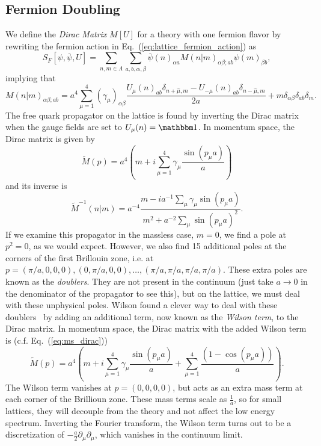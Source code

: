 \subsection{Fermion Doubling}
We define the \emph{Dirac Matrix} $M[U]$ for a theory with one fermion flavor by rewriting the fermion action in Eq.~(\ref{eq:lattice_fermion_action}) as
\begin{equation}
    S_F[\psi, \overline \psi, U] = \sum_{n,m\in \Lambda} \sum_{a,b,\alpha,\beta} \overline \psi(n)_{\alpha a} M(n|m)_{\alpha\beta;a b} \psi(m)_{\beta b},
\end{equation}
implying that
\begin{equation}
    M(n | m)_{\alpha \beta; a b} = a^4\sum_{\mu=1}^{4}\left(\gamma_{\mu}\right)_{\alpha \beta} \frac{U_{\mu}(n)_{a b} \delta_{n+\hat{\mu}, m}-U_{-\mu}(n)_{a b} \delta_{n-\hat{\mu}, m}}{2 a}+m \delta_{\alpha \beta} \delta_{a b} \delta_{ m}.
\end{equation}
The free quark propagator on the lattice is found by inverting the Dirac matrix when the gauge fields are set to $U_\mu(n) = \mathbbm 1$. In momentum space, the Dirac matrix is given by
\begin{equation}\label{eq:ms_dirac}
    \widetilde{M}(p)=a^4 \left(m + i \sum_{\mu=1}^{4} \gamma_{\mu} \frac{\sin \left(p_{\mu} a\right)}{a}\right)
\end{equation}
and its inverse is
\begin{equation}
    \widetilde M^{-1}(n|m) = a^{-4}\frac{m - ia^{-1}\sum_\mu \gamma_\mu \sin(p_\mu a)}{m^2 + a^{-2}\sum_\mu\sin(p_\mu a)^2}.
\end{equation}
If we examine this propagator in the massless case, $m=0$, we find a pole at $p^2 = 0$, as we would expect. However, we also find 15 additional poles at the corners of the first Brillouin zone, i.e. at $p=(\pi / a, 0,0,0),(0, \pi / a, 0,0), \ldots,(\pi / a, \pi / a, \pi / a, \pi / a)$. These extra poles are known as the \emph{doublers}. They are not present in the continuum (just take $a\rightarrow 0$ in the denominator of the propagator to see this), but on the lattice, we must deal with these unphysical poles. Wilson found a clever way to deal with these doublers~\cite{Wilson:1975id} by adding an additional term, now known as the \emph{Wilson term}, to the Dirac matrix. In momentum space, the Dirac matrix with the added Wilson term is (c.f. Eq.~(\ref{eq:ms_dirac}))
\begin{equation}
    \widetilde{M}(p)=a^4\left(m +i \sum_{\mu=1}^{4} \gamma_{\mu} \frac{\sin \left(p_{\mu} a\right)}{a}+ \sum_{\mu=1}^{4}\frac{\left(1-\cos \left(p_{\mu} a\right)\right)}{a}\right).
\end{equation}
The Wilson term vanishes at $p=(0,0,0,0)$, but acts as an extra mass term at each corner of the Brillioun zone. These mass terms scale as $\frac{1}{a}$, so for small lattices, they will decouple from the theory and not affect the low energy spectrum. Inverting the Fourier transform, the Wilson term turns out to be a discretization of $-\frac{a}{2}\partial_\mu \partial_\mu$, which vanishes in the continuum limit.

